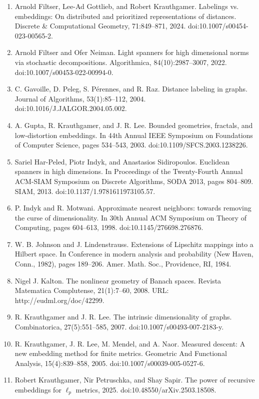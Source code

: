 \begin{enumerate}
\item[]  [21]  Arnold Filtser, Lee-Ad Gottlieb, and Robert Krauthgamer.  Labelings vs. embeddings: On distributed and prioritized representations of distances.  Discrete \& Computational Geometry, 71:849–871, 2024.  doi:10.1007/s00454-023-00565-2.  
\item[]  [22]  Arnold Filtser and Ofer Neiman.  Light spanners for high dimensional norms via stochastic decompositions.  Algorithmica, 84(10):2987–3007, 2022.  doi:10.1007/s00453-022-00994-0.  
\item[]  [23]  C. Gavoille, D. Peleg, S. Pérennes, and R. Raz.  Distance labeling in graphs.  Journal of Algorithms, 53(1):85–112, 2004.  doi:10.1016/J.JALGOR.2004.05.002.  
\item[]  [24]  A. Gupta, R. Krauthgamer, and J. R. Lee.  Bounded geometries, fractals, and low-distortion embeddings.  In 44th Annual IEEE Symposium on Foundations of Computer Science, pages 534–543, 2003.  doi:10.1109/SFCS.2003.1238226.  
\item[]  [25]  Sariel Har-Peled, Piotr Indyk, and Anastasios Sidiropoulos.  Euclidean spanners in high dimensions.  In Proceedings of the Twenty-Fourth Annual ACM-SIAM Symposium on Discrete Algorithms, SODA 2013, pages 804–809. SIAM, 2013.  doi:10.1137/1.9781611973105.57.  
\item[]  [26]  P. Indyk and R. Motwani.  Approximate nearest neighbors: towards removing the curse of dimensionality.  In 30th Annual ACM Symposium on Theory of Computing, pages 604–613, 1998.  doi:10.1145/276698.276876.  
\item[]  [27]  W. B. Johnson and J. Lindenstrauss.  Extensions of Lipschitz mappings into a Hilbert space.  In Conference in modern analysis and probability (New Haven, Conn., 1982), pages 189–206. Amer. Math. Soc., Providence, RI, 1984.  
\item[]  [28]  Nigel J. Kalton.  The nonlinear geometry of Banach spaces.  Revista Matematica Complutense, 21(1):7–60, 2008.  URL: http://eudml.org/doc/42299.  
\item[]  [29]  R. Krauthgamer and J. R. Lee.  The intrinsic dimensionality of graphs.  Combinatorica, 27(5):551–585, 2007.  doi:10.1007/s00493-007-2183-y.  
\item[]  [30]  R. Krauthgamer, J. R. Lee, M. Mendel, and A. Naor.  Measured descent: A new embedding method for finite metrics.  Geometric And Functional Analysis, 15(4):839–858, 2005.  doi:10.1007/s00039-005-0527-6.  
\item[]  [31]  Robert Krauthgamer, Nir Petruschka, and Shay Sapir.  The power of recursive embeddings for $\ell_{p}$ metrics, 2025.  doi:10.48550/arXiv.2503.18508.  

\end{enumerate}
